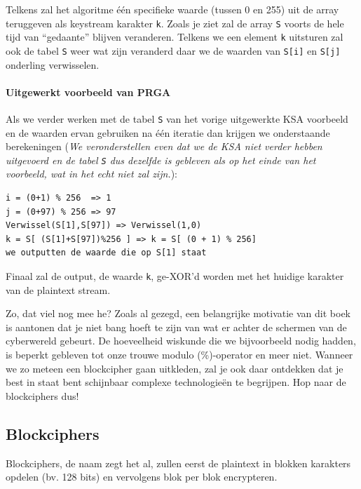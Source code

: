 \documentclass[
  10pt,
  dutch,
  paper=a4,
  ,captions=tableheading
]{scrbook}
\begin{document}
Telkens zal het algoritme één specifieke waarde (tussen 0 en 255) uit de
array teruggeven als keystream karakter \texttt{k}. Zoals je ziet zal de
array \texttt{S} voorts de hele tijd van ``gedaante'' blijven
veranderen. Telkens we een element \texttt{k} uitsturen zal ook de tabel
\texttt{S} weer wat zijn veranderd daar we de waarden van
\texttt{S{[}i{]}} en \texttt{S{[}j{]}} onderling verwisselen.

\paragraph{Uitgewerkt voorbeeld van
PRGA}\label{uitgewerkt-voorbeeld-van-prga}

Als we verder werken met de tabel \texttt{S} van het vorige uitgewerkte
KSA voorbeeld en de waarden ervan gebruiken na één iteratie dan krijgen
we onderstaande berekeningen (\emph{We veronderstellen even dat we de
KSA niet verder hebben uitgevoerd en de tabel \texttt{S} dus dezelfde is
gebleven als op het einde van het voorbeeld, wat in het echt niet zal
zijn.}):

\begin{verbatim}
i = (0+1) % 256  => 1
j = (0+97) % 256 => 97
Verwissel(S[1],S[97]) => Verwissel(1,0)
k = S[ (S[1]+S[97])%256 ] => k = S[ (0 + 1) % 256] 
we outputten de waarde die op S[1] staat
\end{verbatim}

Finaal zal de output, de waarde \texttt{k}, ge-XOR'd worden met het
huidige karakter van de plaintext stream.

\begin{noteblock}
Zo, dat viel nog mee he? Zoals al gezegd, een belangrijke motivatie van
dit boek is aantonen dat je niet bang hoeft te zijn van wat er achter de
schermen van de cyberwereld gebeurt. De hoeveelheid wiskunde die we
bijvoorbeeld nodig hadden, is beperkt gebleven tot onze trouwe modulo
(\%)-operator en meer niet. Wanneer we zo meteen een blockcipher gaan
uitkleden, zal je ook daar ontdekken dat je best in staat bent
schijnbaar complexe technologieën te begrijpen. Hop naar de blockciphers
dus!
\end{noteblock}

\subsection{Blockciphers}\label{blockciphers}

Blockciphers, de naam zegt het al, zullen eerst de plaintext in blokken
karakters opdelen (bv. 128 bits) en vervolgens blok per blok
encrypteren.
\end{document}
